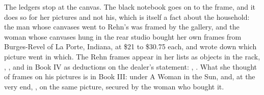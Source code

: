 The ledgers stop at the canvas. The black notebook goes on to the frame, and it does so for her pictures and not his, which is itself a fact about the household: the man whose canvases went to Rehn's was framed by the gallery, and the woman whose canvases hung in the rear studio bought her own frames from Burges-Revel of La Porte, Indiana, at \$21 to \$30.75 each, and wrote down which picture went in which. The Rehn frames appear in her lists as objects in the rack, , , and in Book IV as deductions on the dealer's statement: , . What she thought of frames on his pictures is in Book III:  under A Woman in the Sun, and, at the very end, , on the same picture, secured by the woman who bought it.
